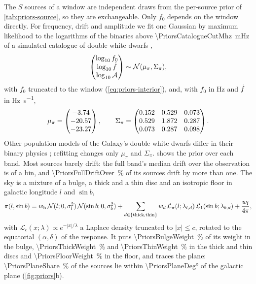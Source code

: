 The $S$ sources of a window are independent draws from the per-source prior of
\cref{tab:priors-source}, so they are exchangeable. Only $f_0$ depends on the window directly. For
frequency, drift and amplitude we fit one Gaussian by maximum likelihood to the logarithms of the
binaries above \qty{\PriorsCatalogueCutMhz}{\milli\hertz} of a simulated catalogue of double white
dwarfs \citep{perego2025towards,breivik2020cosmic},
\begin{equation}
  \begin{pmatrix}\log_{10}f_0\\ \log_{10}\dot f\\ \log_{10}\mathcal{A}\end{pmatrix}
  \sim \mathcal{N}(\mu_\pi, \Sigma_\pi),
  \label{eq:priors-source}
\end{equation}
with $f_0$ truncated to the window (\cref{eq:priors-interior}), and, with $f_0$ in \unit{\hertz} and
$\dot f$ in \unit{\hertz\per\second},
\begin{equation}
  \mu_\pi = \begin{pmatrix}-3.74\\ -20.57\\ -23.27\end{pmatrix},\qquad
  \Sigma_\pi = \begin{pmatrix}
    0.152 & 0.529 & 0.073\\
    0.529 & 1.872 & 0.287\\
    0.073 & 0.287 & 0.098
  \end{pmatrix}.
  \label{eq:priors-mean}
\end{equation}
Other population models of the Galaxy's double white dwarfs
\citep{toonen2012supernova,korol2020populations,georgousi2022gravitational,thiele2023applying}
differ in their binary physics \citep{toubiana2024interacting,boileau2025gravitational}; refitting
changes only $\mu_\pi$ and $\Sigma_\pi$.  shows the prior over each band. Most sources barely drift: the full band's median drift over
the observation is \rev{\num{\PriorsFullDriftMedian}} of a bin, and \qty{\PriorsFullDriftOver}{\percent} of its
sources drift by more than one. The sky is a mixture of a bulge, a thick and a thin disc and an
isotropic floor in galactic longitude $l$ and $\sin b$,
\begin{equation}
  \pi(l, \sin b) = w_{\rm b}\,\mathcal{N}(l; 0, \sigma_l^2)\,\mathcal{N}(\sin b; 0, \sigma_b^2)
  + \sum_{d\in\{\rm thick, thin\}} w_d\,\mathcal{L}_{\pi}(l; \lambda_{l,d})\,\mathcal{L}_{1}(\sin b; \lambda_{b,d})
  + \frac{w_{\rm f}}{4\pi},
  \label{eq:priors-sky}
\end{equation}
with $\mathcal{L}_c(x;\lambda)\propto e^{-|x|/\lambda}$ a Laplace density truncated to $|x|\le c$,
rotated to the equatorial $(\alpha,\delta)$ of the response. It puts \qty{\PriorsBulgeWeight}{\percent}
of its weight in the bulge, \qty{\PriorsThickWeight}{\percent} and \qty{\PriorsThinWeight}{\percent} in
the thick and thin discs and \qty{\PriorsFloorWeight}{\percent} in the floor, and traces the plane:
\qty{\PriorsPlaneShare}{\percent} of the sources lie within \ang{\PriorsPlaneDeg} of the galactic
plane (\cref{fig:priors}b).


